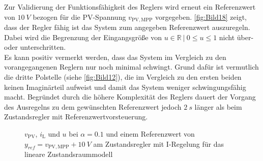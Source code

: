 Zur Validierung der Funktionsfähigkeit des Reglers wird erneut ein Referenzwert von $\SI{+10}{V}$ bezogen für die PV-Spannung $v_{\mathrm{PV,MPP}}$ vorgegeben. \autoref{fig:Bild18} zeigt, dass der Regler fähig ist das System zum angegeben Referenzwert auszuregeln. Dabei wird die Begrenzung der Eingangsgröße von $u \in \mathbb{R} \: | \: 0 \leq u \leq 1$ nicht über- oder unterschritten. \\
Es kann positiv vermerkt werden, dass das System im Vergleich zu den vorangegangenen Reglern nur noch minimal schwingt. Grund dafür ist vermutlich die dritte Polstelle (siehe \autoref{fig:Bild12}), die im Vergleich zu den ersten beiden keinen Imaginärteil aufweist und damit das System weniger schwingungsfähig macht. Begründet durch die höhere Komplexität des Reglers dauert der Vorgang des Ausregelns zu dem gewünschten Referenzwert jedoch \ca $\SI{2}{s}$ länger als beim Zustandsregler mit Referenzwertvorsteuerung.

\begin{figure}[H]
    \centering
    \caption[Validierung Regler mit I-Regelung (linear)]{$v_{\mathrm{PV}}$, $i_{\mathrm{L}}$ und $u$ bei $\alpha = 0.1$ und einem Referenzwert von $y_{ref} = v_{\mathrm{PV,MPP}} + \SI{10}{V}$ am Zustandsregler mit I-Regelung für das lineare Zustandsraummodell}
    \label{fig:Bild18}
\end{figure}

